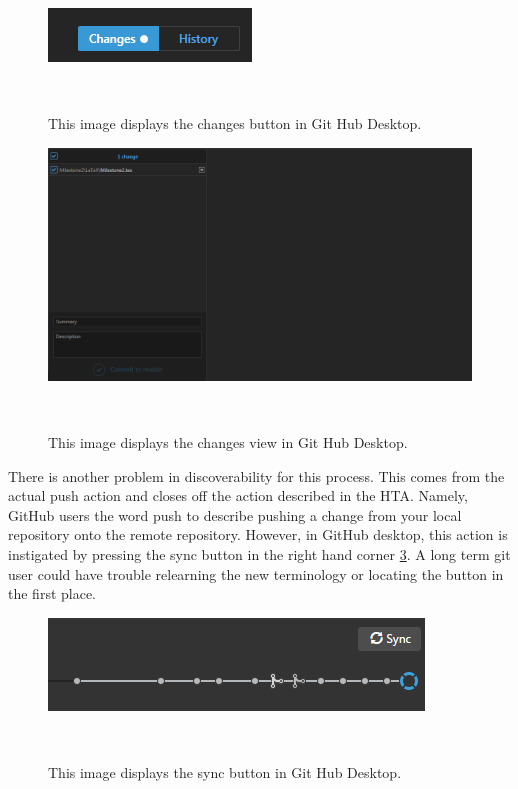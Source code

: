 \documentclass{sigchi}
\begin{document}
\begin{figure}
  \centering
  \includegraphics[width=1.75\columnwidth]{figures/GitHub/Git-Hub-Changes.PNG}
  \caption{This image displays the changes button in Git Hub Desktop.}~\label{fig:GitHub2}
\end{figure}

\begin{figure}
  \centering
  \includegraphics[width=1.75\columnwidth]{figures/GitHub/Git-Hub-Changes-View.PNG}
  \caption{This image displays the changes view in Git Hub Desktop.}~\label{fig:GitHub3}
\end{figure}


There is another problem in discoverability for this process. This comes from the actual push action 
and closes off the action described in the HTA. Namely, GitHub users the word push to describe 
pushing a change from your local repository onto the remote repository. However, in GitHub desktop,
this action is instigated by pressing the sync button in the right hand corner \ref{fig:GitHub4}. A long term git user
could have trouble relearning the new terminology or locating the button in the first place. 

\begin{figure}
  \centering
  \includegraphics[width=1.75\columnwidth]{figures/GitHub/Git-Hub-Changes-Sync.PNG}
  \caption{This image displays the sync button in Git Hub Desktop.}~\label{fig:GitHub4}
\end{figure}
\end{document}
